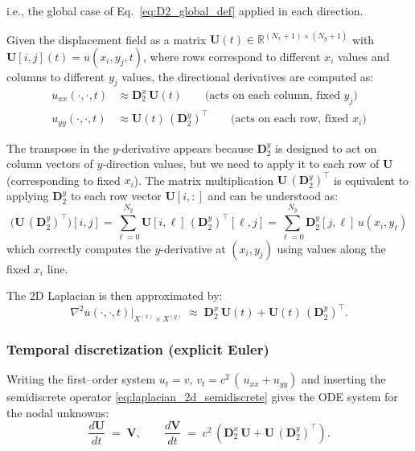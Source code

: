 i.e., the global case of Eq.~\eqref{eq:D2_global_def} applied in each direction.

\clearpage

Given the displacement field as a matrix $\mathbf{U}(t)\in\mathbb{R}^{(N_x+1)\times(N_y+1)}$ with $\mathbf{U}[i,j](t) = u(x_i,y_j,t)$, where rows correspond to different $x_i$ values and columns to different $y_j$ values, the directional derivatives are computed as:
\begin{align}
u_{xx}(\cdot,\cdot,t) &\approx \mathbf{D}_2^x\,\mathbf{U}(t) \qquad \text{(acts on each column, fixed $y_j$)} \\
u_{yy}(\cdot,\cdot,t) &\approx \mathbf{U}(t)\,(\mathbf{D}_2^y)^\top \qquad \text{(acts on each row, fixed $x_i$)}
\end{align}

The transpose in the $y$-derivative appears because $\mathbf{D}_2^y$ is designed to act on column vectors of $y$-direction values, but we need to apply it to each row of $\mathbf{U}$ (corresponding to fixed $x_i$). The matrix multiplication $\mathbf{U}\,(\mathbf{D}_2^y)^\top$ is equivalent to applying $\mathbf{D}_2^y$ to each row vector $\mathbf{U}[i,:]$ and can be understood as:
\[
\big(\mathbf{U}\,(\mathbf{D}_2^y)^\top\big)[i,j] = \sum_{\ell=0}^{N_y} \mathbf{U}[i,\ell] \, (\mathbf{D}_2^y)^\top[\ell,j] = \sum_{\ell=0}^{N_y} \mathbf{D}_2^y[j,\ell] \, u(x_i,y_\ell)
\]
which correctly computes the $y$-derivative at $(x_i,y_j)$ using values along the fixed $x_i$ line.

The 2D Laplacian is then approximated by:
\begin{equation}
\nabla^2 u(\cdot,\cdot,t)\big|_{X^{(x)}\times X^{(y)}}\;\approx\;\mathbf{D}_2^x\,\mathbf{U}(t) + \mathbf{U}(t)\,(\mathbf{D}_2^y)^\top.
\label{eq:laplacian_2d_semidiscrete}
\end{equation}

\subsubsection*{Temporal discretization (explicit Euler)}

Writing the first–order system
$u_t=v$, $v_t=c^2\,(\,u_{xx}+u_{yy})$
and inserting the semidiscrete operator \eqref{eq:laplacian_2d_semidiscrete} gives the
ODE system for the nodal unknowns:
\begin{equation}
\frac{d\mathbf{U}}{dt} \;=\; \mathbf{V},\qquad
\frac{d\mathbf{V}}{dt} \;=\; c^2\,\left(\mathbf{D}_2^x\,\mathbf{U} + \mathbf{U}\,(\mathbf{D}_2^y)^\top\right).
\label{eq:semi_discrete_ode_2d}
\end{equation}

